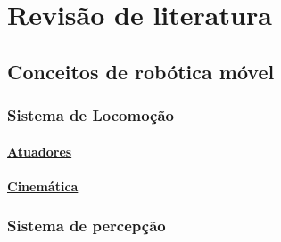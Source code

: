 
    \chapter{Revisão de literatura}\label{cap:revisão de literatura}

    \section{\textbf{Conceitos de robótica móvel}}

    \subsection{Sistema de Locomoção}

    \subsubsection{\uline{Atuadores}}

    \subsubsection{\uline{Cinemática}}

    \subsection{Sistema de percepção}

